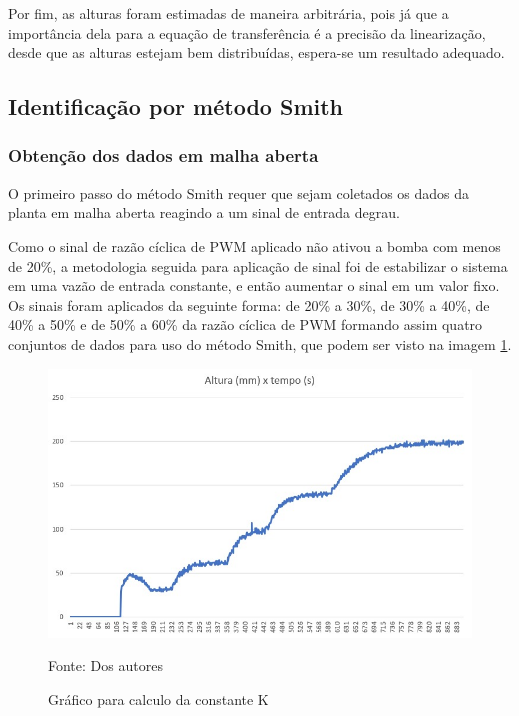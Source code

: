 Por fim, as alturas foram estimadas de maneira arbitrária, pois já que a importância dela para a equação de transferência é a precisão da linearização, desde que as alturas estejam bem distribuídas, espera-se um resultado adequado.

\subsection{Identificação por método Smith}

\subsubsection{Obtenção dos dados em malha aberta}
\hspace{11mm}O primeiro passo do método Smith requer que sejam coletados os dados da planta em malha aberta reagindo a um sinal de entrada degrau.

Como o sinal de razão cíclica de PWM aplicado não ativou a bomba com menos de 20\%, a metodologia seguida para aplicação de sinal foi de estabilizar o sistema em uma vazão de entrada constante, e então aumentar o sinal em um valor fixo. Os sinais foram aplicados da seguinte forma: de 20\% a 30\%, de 30\% a 40\%, de 40\% a 50\% e de 50\% a 60\% da razão cíclica de PWM formando assim quatro conjuntos de dados para uso do método Smith, que podem ser visto na imagem \ref{fig:graf}.

\begin{figure}[H]
    \centering\footnotesize
    \caption{Gráfico para calculo da constante K}
    \begin{center}
        \includegraphics[scale=0.5]{imagens/grafico1.jpeg}
    \end{center}
    \label{fig:graf}
    \par Fonte: Dos autores
\end{figure}

